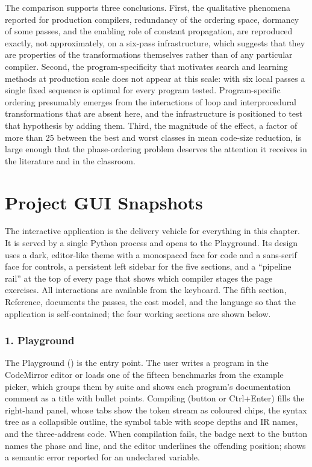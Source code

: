 The comparison supports three conclusions. First, the qualitative phenomena reported for production compilers, redundancy of the ordering space, dormancy of some passes, and the enabling role of constant propagation, are reproduced exactly, not approximately, on a six-pass infrastructure, which suggests that they are properties of the transformations themselves rather than of any particular compiler. Second, the program-specificity that motivates search and learning methods at production scale does not appear at this scale: with six local passes a single fixed sequence is optimal for every program tested. Program-specific ordering presumably emerges from the interactions of loop and interprocedural transformations that are absent here, and the infrastructure is positioned to test that hypothesis by adding them. Third, the magnitude of the effect, a factor of more than 25 between the best and worst classes in mean code-size reduction, is large enough that the phase-ordering problem deserves the attention it receives in the literature and in the classroom.

\section{Project GUI Snapshots}
\label{sec:gui}

The interactive application is the delivery vehicle for everything in this chapter. It is served by a single Python process and opens to the Playground. Its design uses a dark, editor-like theme with a monospaced face for code and a sans-serif face for controls, a persistent left sidebar for the five sections, and a ``pipeline rail'' at the top of every page that shows which compiler stages the page exercises. All interactions are available from the keyboard. The fifth section, Reference, documents the passes, the cost model, and the language so that the application is self-contained; the four working sections are shown below.

\subsubsection*{1. Playground}

The Playground () is the entry point. The user writes a program in the CodeMirror editor or loads one of the fifteen benchmarks from the example picker, which groups them by suite and shows each program's documentation comment as a title with bullet points. Compiling (button or Ctrl+Enter) fills the right-hand panel, whose tabs show the token stream as coloured chips, the syntax tree as a collapsible outline, the symbol table with scope depths and IR names, and the three-address code. When compilation fails, the badge next to the button names the phase and line, and the editor underlines the offending position;  shows a semantic error reported for an undeclared variable.


